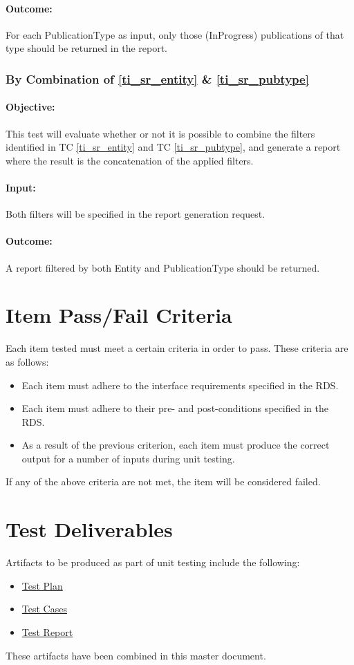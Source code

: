 \paragraph{Outcome:}
For each PublicationType as input, only those (InProgress) publications of that type should be returned in the report.

\subsubsection{By Combination of \ref{ti_sr_entity} \& \ref{ti_sr_pubtype}}
\paragraph{Objective:}
This test will evaluate whether or not it is possible to combine the filters identified in TC \ref{ti_sr_entity} and TC \ref{ti_sr_pubtype}, and generate a report where the result is the concatenation of the applied filters.
\paragraph{Input:}
Both filters will be specified in the report generation request.
\paragraph{Outcome:}
A report filtered by both Entity and PublicationType should be returned.

\section{Item Pass/Fail Criteria}
\label{sec:passFailCrit}

Each item tested must meet a certain criteria in order to pass. These criteria are as follows:
\begin{itemize}
	\item Each item must adhere to the interface requirements specified in the RDS.
	\item Each item must adhere to their pre- and post-conditions specified in the RDS.
	\item As a result of the previous criterion, each item must produce the correct output for a number of inputs during unit testing.
\end{itemize}
If any of the above criteria are not met, the item will be considered failed.

\section{Test Deliverables}
\label{sec:testDeliverables}
Artifacts to be produced as part of unit testing include the following:
\begin{itemize}
	\item \hyperlink{labelp}{Test Plan}
	\item \hyperlink{label}{Test Cases}
	\item \hyperlink{labelr}{Test Report}
\end{itemize}
These artifacts have been combined in this master document.

